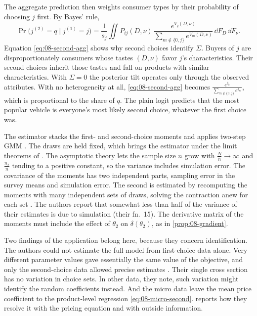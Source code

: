 The aggregate prediction then weights consumer types by their probability of choosing $j$ first. By Bayes' rule,
\begin{equation}\label{eq:08-second-agg}
  \Pr\big(j^{(2)} = q \mid j^{(1)} = j\big) = \frac{1}{s_j}\iint P_{ij}(D, \nu)\,
  \frac{e^{V_q(D,\nu)}}{\sum_{m \notin\{0, j\}} e^{V_m(D,\nu)}}\,\dd F_D\,\dd F_\nu .
\end{equation}
Equation \eqref{eq:08-second-agg} shows why second choices identify $\Sigma$. Buyers of $j$ are disproportionately
consumers whose tastes $(D, \nu)$ favor $j$'s characteristics. Their second choices inherit those tastes and fall on
products with similar characteristics. With $\Sigma = 0$ the posterior tilt operates only through the observed
attributes. With no heterogeneity at all, \eqref{eq:08-second-agg} becomes
$\frac{e^{\delta_q}}{\sum_{m\notin\{0,j\}}e^{\delta_m}}$, which is proportional to the share of $q$. The plain logit
predicts that the most popular vehicle is everyone's most likely second choice, whatever the first choice was.

The estimator stacks the first- and second-choice moments and applies two-step GMM \citep{Hansen1982}. The draws are
held fixed, which brings the estimator under the limit theorems of \citet{PakesPollard1989}. The asymptotic theory lets
the sample size $n$ grow with $\frac{N}{n} \to \infty$ and $\frac{n_s}{n}$ tending to a positive constant, so the
variance includes simulation error. The covariance of the moments has two independent parts, sampling error in the
survey means and simulation error. The second is estimated by recomputing the moments with many independent sets of
draws, solving the contraction anew for each set \citep[Appendix and fn.~24]{BerryLevinsohnPakes2004}. The authors
report that somewhat less than half of the variance of their estimates is due to simulation (their fn.~15). The
derivative matrix of the moments must include the effect of $\theta_2$ on $\delta(\theta_2)$, as in
\cref{prop:08-gradient}.

Two findings of the application belong here, because they concern identification. The authors could not estimate the
full model from first-choice data alone. Very different parameter values gave essentially the same value of the
objective, and only the second-choice data allowed precise estimates
\citep[p.~90]{BerryLevinsohnPakes2004}. Their single cross section has no variation in choice sets. In other data,
they note, such variation might identify the random coefficients instead. And the micro data leave the mean price
coefficient to the product-level regression \eqref{eq:08-micro-second}.  reports how they resolve
it with the pricing equation and with outside information.

